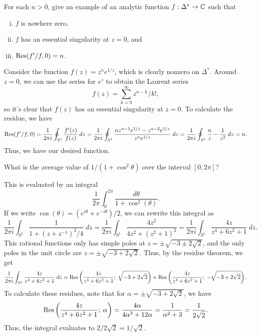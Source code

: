\documentclass{pset}
\begin{document}
\begin{problem}{22}
  For each $n > 0$, give an example of an analytic function $f : \Delta^* \to \mathbb{C}$ such that
  \begin{enumerate}[(i)]
    \item $f$ is nowhere zero,
    \item $f$ has an essential singularity at $z=0$, and
    \item $\textrm{Res}(f' /f, 0) = n$.
  \end{enumerate}
\end{problem}

\begin{solution}
  Consider the function $f(z)=z^ne^{1/z}$, which is clearly nonzero on $\Delta^*$. Around $z=0$, we can use the series for $e^z$ to obtain the Laurent series 
  \[f(z) = \sum^\infty_{k=0} z^{n-k} / k!,\]
  so it's clear that $f(z)$ has an essential singularity at $z=0$. To calculate the residue, we have
  \[\begin{aligned}
    \textrm{Res}(f' / f, 0) = \frac{1}{2\pi i}\oint_{S^1} \frac{f'(z)}{f(z)}\;dz = \frac{1}{2\pi i}\oint_{S^1} \frac{nz^{n-1}e^{1/z} - z^{n-2} e^{1/z}}{z^n e^{1/z}}\;dz= \frac{1}{2\pi i}\oint_{S^1} \frac{n}{z} - \frac{1}{z^2}\;dz =n.
  \end{aligned}\]
  Thus, we have our desired function.
\end{solution}

\begin{problem}{26}
  What is the average value of $1/(1 + \cos^2\theta)$ over the interval $[0, 2\pi]$?
\end{problem}

\begin{solution}
  This is evaluated by an integral
  \[
    \frac{1}{2\pi}\int_{0}^{2\pi} \frac{d\theta}{1+\cos^2(\theta)}.
  \]
  If we write $\cos(\theta)=(e^{i\theta} + e^{-i\theta}) / 2$, we can rewrite this integral as
  \[
    \frac{1}{2\pi i}\int_{S^1} \frac{1}{1+(z+z^{-1})^2 / 4}\;dz = \frac{1}{2\pi i} \int_{S^1} \frac{4z^2}{4z^2+(z^2+1)^2}=
    \frac{1}{2\pi i}\int_{S^1} \frac{4z}{z^4+6z^2+1}\;dz.
  \]
  This rational functions only has simple poles at $z = \pm\sqrt{-3\pm 2\sqrt{2}}$, and the only poles in the unit circle are $z=\pm \sqrt{-3+2\sqrt{2}}$. Thus, by the residue theorem, we get
  \[
    \frac{1}{2\pi i}\int_{S^1} \frac{4z}{z^4+6z^2+1}\;dz = 
    \textrm{Res}\left(\frac{4z}{z^4+6z^2+1};\; \sqrt{-3+2\sqrt{2}}\right)
    +\textrm{Res}\left(\frac{4z}{z^4+6z^2+1};\; -\sqrt{-3+2\sqrt{2}}\right).
  \]
  To calculate these residues, note that for $\alpha=\pm \sqrt{-3+2\sqrt{2}}$, we have
  \[\textrm{Res}\left(\frac{4z}{z^4+6z^2+1};\; \alpha\right) = \frac{4\alpha}{4\alpha^3 + 12\alpha} = \frac{1}{\alpha^2 + 3} = \frac{1}{2\sqrt{2}}.\]
  Thus, the integral evaluates to $2/2\sqrt{2} = 1/\sqrt{2}$.
\end{solution}
\end{document}
